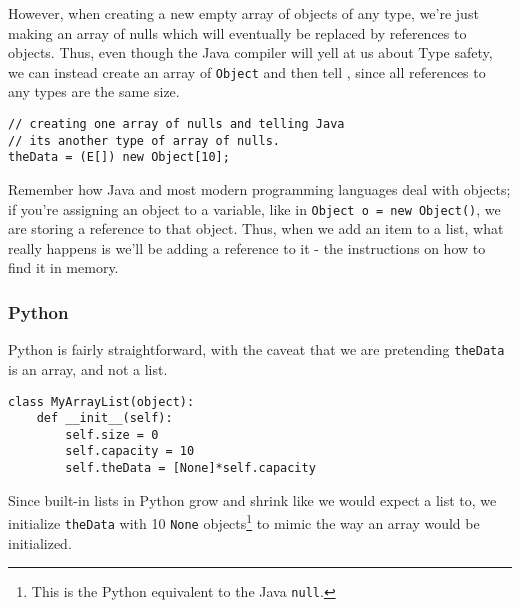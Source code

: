 However, when creating a new empty array of objects of any type, we're just making an array of nulls which will eventually be replaced by references to objects.  Thus, even though the Java compiler will yell at us about Type safety, we can instead create an array of \texttt{Object} and then tell , since all references to any types are the same size.

\begin{verbatim}
// creating one array of nulls and telling Java 
// its another type of array of nulls. 
theData = (E[]) new Object[10];
\end{verbatim}



Remember how Java and most modern programming languages deal with objects; if you're assigning an object to a variable, like in \texttt{Object o = new Object()}, we are storing a reference to that object.
Thus, when we add an item to a list, what really happens is we'll be adding a reference to it - the instructions on how to find it in memory.


\subsubsection{Python}
Python is fairly straightforward, with the caveat that we are pretending \texttt{theData} is an array, and not a list.

\begin{verbatim}
class MyArrayList(object):
	def __init__(self):
		self.size = 0
		self.capacity = 10
		self.theData = [None]*self.capacity
\end{verbatim}

Since built-in lists in Python grow and shrink like we would expect a list to, we initialize \texttt{theData} with 10 \texttt{None} objects\footnote{This is the Python equivalent to the Java \texttt{null}.} to mimic the way an array would be initialized.



%
%
%

